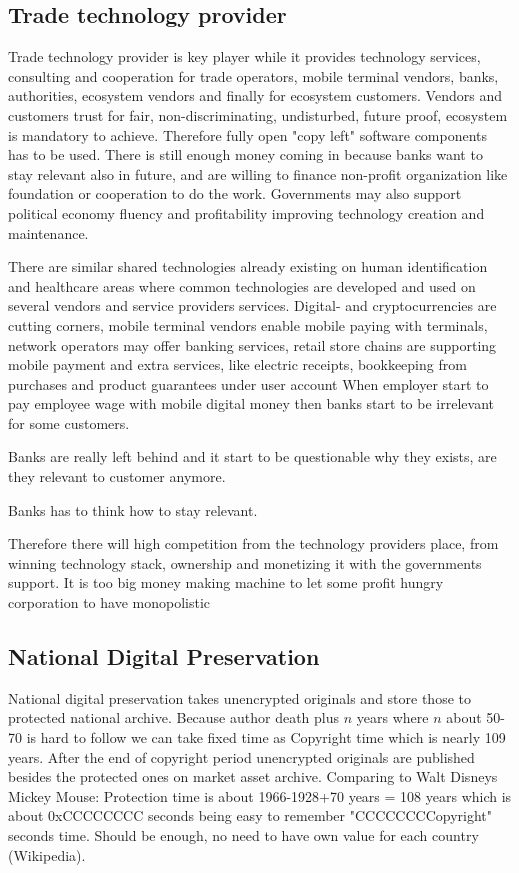 \subsection{Trade technology provider}
\label{tehnology_provider}

Trade technology provider is key player while it provides technology services, consulting and cooperation for trade operators, mobile terminal vendors, banks, authorities, ecosystem vendors and finally for ecosystem customers. Vendors and customers trust for fair, non-discriminating, undisturbed, future proof, ecosystem is mandatory to achieve. Therefore fully open "copy left" software components has to be used. There is still enough money coming in because banks want to stay relevant also in future, and are willing to finance non-profit organization like foundation or cooperation to do the work. Governments may also support political economy fluency and profitability improving technology creation and maintenance.

There are similar shared technologies already existing on human identification and healthcare areas where common technologies are developed and used on several vendors and service providers services. Digital- and cryptocurrencies are cutting corners, mobile terminal vendors enable mobile paying with terminals, network operators may offer banking services, retail store chains are supporting mobile payment and extra services, like electric receipts, bookkeeping from purchases and product guarantees under user account When employer start to pay employee wage with mobile digital money then banks start to be irrelevant for some customers.

Banks are really left behind and it start to be questionable why they exists, are they relevant to customer anymore. 

Banks has to think how to stay relevant.

Therefore there will high competition from the technology pro\-viders place, from winning technology stack, ownership and monetizing it with the governments support. It is too big money making machine to let some profit hungry corporation to have monopolistic 

\subsection{National Digital Preservation}
\label{digital_preservation}
National digital preservation takes unencrypted originals and store those to protected national archive. Because author death plus $n$ years where $n$ about 50-70 is hard to follow we can take fixed time as Copyright time which is nearly 109 years. After the end of copyright period unencrypted originals are published besides the protected ones on market asset archive. Comparing to Walt Disneys Mickey Mouse: Protection time is about 1966-1928+70 years = 108 years which is about 0xCCCCCCCC seconds being easy to remember "CCCCCCCCopyright" seconds time. Should be enough, no need to have own value for each country (Wikipedia\cite{CopyrightLenghts}).

